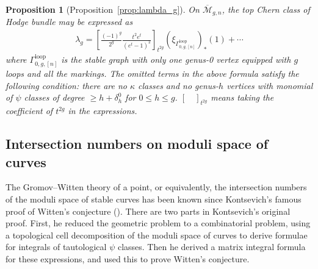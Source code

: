 \documentclass[12pt,reqno]{amsart}
\newcommand{\Gammaloop}{\Gamma^\mathrm{loop}}
\theoremstyle{plain}
\newtheorem{proposition}[theorem]{Proposition}
\theoremstyle{definition}
\theoremstyle{remark}
\begin{document}
\begin{proposition}
[Proposition~\ref{prop:lambda_g}]
    On $\overline{\mathcal{M}}_{g,n}$, the top Chern class of Hodge bundle may be expressed as
\begin{align*}
\lambda_g=\left[\frac{(-1)^g}{2^g}\frac{t^2e^t}{(e^t-1)^2}\right]_{t^{2g}}
\left(\xi_{\Gammaloop_{0,g,[n]}}\right)_*(1)+\cdots    
\end{align*}
where $\Gammaloop_{0,g,[n]}$ is the stable graph with only one genus-0 vertex equipped with $g$ loops and all the markings.
The omitted terms in the above formula satisfy the following condition: there are no
$\kappa$ classes and no genus-$h$ vertices with monomial of $\psi$ classes of degree $\geq h+\delta_{h}^0$ for
$0\leq h\leq g$. $[\quad]_{t^{2g}}$ means taking the coefficient of $t^{2g}$ in the expressions.
\end{proposition}
\subsection{ Intersection numbers on moduli space of curves}
 
The Gromov--Witten theory of a point, or equivalently, the intersection numbers of the moduli space of stable
curves has been known since Kontsevich's famous proof of Witten's conjecture (\cite{witten1990two}).
There are two parts in Kontsevich's original proof.
First, he reduced the geometric problem to a combinatorial problem, using a topological cell decomposition of the moduli space of
curves to derive formulae for integrals of tautological $\psi$ classes.
Then he derived a matrix integral formula for these expressions, and used this to prove Witten's conjecture.
\end{document}
